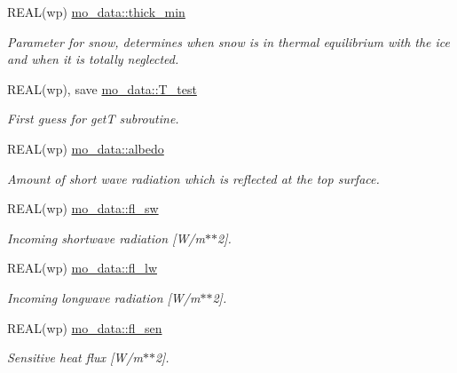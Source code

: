 \begin{DoxyCompactItemize}
REAL(wp) \hyperlink{namespacemo__data_a866fe962819eea1c688afb5b07109bdd}{mo\_\-data::thick\_\-min}
\begin{DoxyCompactList}\small\item\em Parameter for snow, determines when snow is in thermal equilibrium with the ice and when it is totally neglected. \item\end{DoxyCompactList}\item 
REAL(wp), save \hyperlink{namespacemo__data_a7b3b4a04c1efd94e6c3f21e9bfd5fdad}{mo\_\-data::T\_\-test}
\begin{DoxyCompactList}\small\item\em First guess for getT subroutine. \item\end{DoxyCompactList}\item 
REAL(wp) \hyperlink{namespacemo__data_a4e0875d21076b42177bdff28faf75a53}{mo\_\-data::albedo}
\begin{DoxyCompactList}\small\item\em Amount of short wave radiation which is reflected at the top surface. \item\end{DoxyCompactList}\item 
REAL(wp) \hyperlink{namespacemo__data_a848f22357479c2be98599195b61991f7}{mo\_\-data::fl\_\-sw}
\begin{DoxyCompactList}\small\item\em Incoming shortwave radiation \mbox{[}W/m$\ast$$\ast$2\mbox{]}. \item\end{DoxyCompactList}\item 
REAL(wp) \hyperlink{namespacemo__data_a0224a603e8070ac503b13ae82c8e6b99}{mo\_\-data::fl\_\-lw}
\begin{DoxyCompactList}\small\item\em Incoming longwave radiation \mbox{[}W/m$\ast$$\ast$2\mbox{]}. \item\end{DoxyCompactList}\item 
REAL(wp) \hyperlink{namespacemo__data_a46e3fef58a1955a30678d73ddc044c9a}{mo\_\-data::fl\_\-sen}
\begin{DoxyCompactList}\small\item\em Sensitive heat flux \mbox{[}W/m$\ast$$\ast$2\mbox{]}. \item\end{DoxyCompactList}\item 

\end{DoxyCompactItemize}
